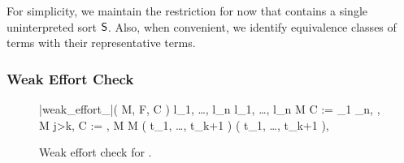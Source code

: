 \documentclass{svjour3}                     %
\begin{document}
For simplicity, we maintain the restriction for now that \fcc contains 
a single uninterpreted sort $\mathsf{S}$.
Also, when convenient, we identify equivalence classes of terms
with their representative terms.


\subsubsection*{Weak Effort Check}

\begin{figure}[t]
\begin{program}
\PROC |weak\_effort\_\fcc|( M, F, C ) \BODY 
  \IF l_1, \ldots, l_n \ent[\euf] \bot {} l_1, \ldots, l_n \in M
     C := _1 \vee \cdots \vee {}_n,  
  \ELSEIF \card[\So,k], \neg \card[\So,j] \in M  j>k,
     C := \neg \card[\So,k] \vee \card[\So,j],  
  \ELSEIF \card[\So,k] \in M  M \ent[\euf] \distinct( t_1, \ldots, t_{k+1} )
     \neg \card[\So,k] \vee \neg \distinct( t_1, \ldots, t_{k+1} ),  
  \ELSE
     
\ENDPROC
\end{program}
\caption{
Weak effort check for \fcc.
}
\label{fig:fcc-dpllts-opt-weak-strategy}
\end{figure}
\end{document}
